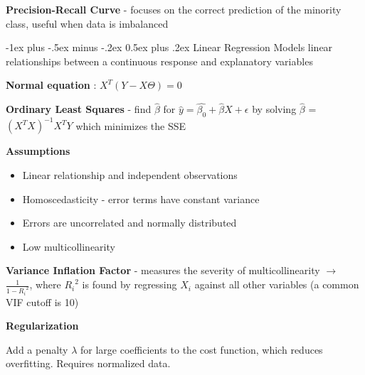 \documentclass[10pt,landscape]{article}
\makeatletter
\renewcommand{\section}{\@startsection{section}{1}{0mm}%
                                {-1ex plus -.5ex minus -.2ex}%
                                {0.5ex plus .2ex}%
                                {\normalfont\large\bfseries}}
\makeatother
\begin{document}
\begin{multicols}{3}
    \textbf{Precision-Recall Curve} - focuses on the correct prediction of the minority class, useful when data is imbalanced

    \section{Linear Regression}
    Models linear relationships between a continuous response and explanatory variables

    \textbf{Normal equation} : $X^T(Y-X \Theta) = 0$

    \textbf{Ordinary Least Squares} - find $\hat{\beta}$ for $\hat{y} = \hat{\beta_{0}} + \hat{\beta}X + \epsilon$
    by solving $\hat{\beta}$ = $(X^{T}X)^{-1}X^{T}Y$ which minimizes the SSE

    \textbf{Assumptions}
    \begin{itemize}[label={--},leftmargin=4mm]
        \vspace{-1mm}
        \itemsep -.4mm
        \item Linear relationship and independent observations
        \item Homoscedasticity - error terms have constant variance
        \item Errors are uncorrelated and normally distributed
        \item Low multicollinearity
    \end{itemize}

    \textbf{Variance Inflation Factor} - measures the severity of multicollinearity $\to$ $\frac{1}{1-{R_i}^2}$, where ${R_i}^2$ is found by regressing $X_i$ against all other variables (a common VIF cutoff is 10)

    \textbf{Regularization}

    Add a penalty $\lambda$ for large coefficients to the cost function, which reduces overfitting. Requires normalized data.


\end{multicols}
\end{document}
